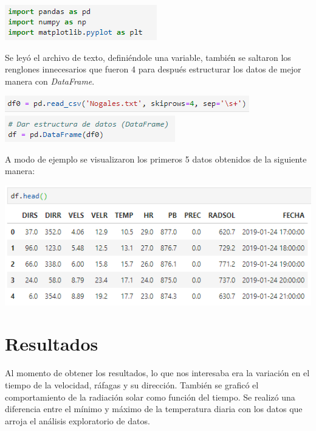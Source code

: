 \documentclass{article}
\begin{document}
\begin{center}
    \includegraphics[scale = 1]{Librerias.png}
\end{center}

\noindent Se leyó el archivo de texto, definiéndole una variable, también se saltaron los renglones innecesarios que fueron 4 para después estructurar los datos de mejor manera con \textit{DataFrame}.

\begin{center}
    \includegraphics[scale = 1]{read.png}
    \includegraphics[scale = 1]{DataFrame.png}
\end{center}

A modo de ejemplo se visualizaron los primeros 5 datos obtenidos de la siguiente manera:

\begin{center}
    \includegraphics[scale = 1]{head.png}
\end{center}

\section{Resultados}

\noindent Al momento de obtener los resultados, lo que nos interesaba era la variación en el tiempo de la velocidad, ráfagas y su dirección. También se graficó el comportamiento de la radiación solar como función del tiempo. Se realizó una diferencia entre el mínimo y máximo de la temperatura diaria con los datos que arroja el análisis exploratorio de datos.
\clearpage
\end{document}

